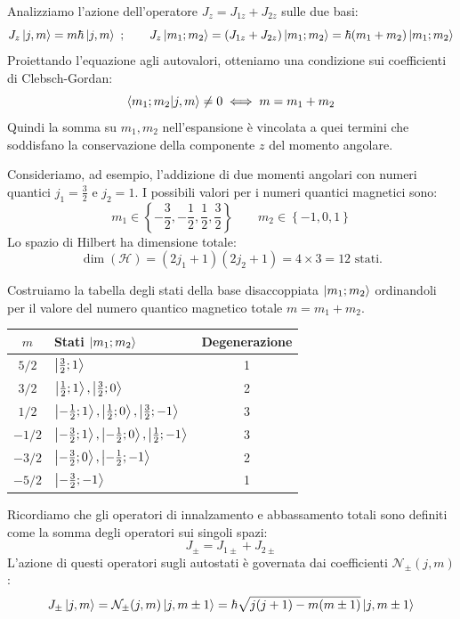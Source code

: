 Analizziamo l'azione dell'operatore $J_z = J_{1z} + J_{2z}$ sulle due basi:
\[
    J_z \ket{j, m} = m\hbar \ket{j, m} \ ;
    \qquad
    J_z \ket{m_1; m_2} = (J_{1z} + J_{2z})\ket{m_1; m_2} = \hbar(m_1 + m_2)\ket{m_1; m_2}
\]
Proiettando l'equazione agli autovalori, otteniamo una condizione sui coefficienti di Clebsch-Gordan:
\begin{equation}
    \braket{m_1; m_2}{j, m} \neq 0 \iff m = m_1 + m_2
\end{equation}
Quindi la somma su $m_1, m_2$ nell'espansione è vincolata a quei termini che soddisfano la conservazione della componente $z$ del momento angolare.

Consideriamo, ad esempio, l'addizione di due momenti angolari con numeri quantici $j_1 = \frac{3}{2}$ e $j_2 = 1$.
I possibili valori per i numeri quantici magnetici sono:
\[
    m_1 \in \left\{ -\frac{3}{2}, -\frac{1}{2}, \frac{1}{2}, \frac{3}{2} \right\} \qquad 
    m_2 \in \left\{ -1, 0, 1 \right\}
\]
Lo spazio di Hilbert ha dimensione totale:
\[
    \dim(\mathcal{H}) = (2j_1+1)(2j_2+1) = 4 \times 3 = 12 \text{ stati}.
\]

Costruiamo la tabella degli stati della base disaccoppiata $\ket{m_1; m_2}$ ordinandoli per il valore del numero quantico magnetico totale $m = m_1 + m_2$.

\begin{center}
\begin{tabular}{c | l | c}
    $m$ & Stati $\ket{m_1; m_2}$ & Degenerazione \\
    \hline
    $5/2$ & $\ket{\frac{3}{2}; 1}$ & 1 \\
    $3/2$ & $\ket{\frac{1}{2}; 1}, \ket{\frac{3}{2}; 0}$ & 2 \\
    $1/2$ & $\ket{-\frac{1}{2}; 1}, \ket{\frac{1}{2}; 0}, \ket{\frac{3}{2}; -1}$ & 3 \\
    $-1/2$ & $\ket{-\frac{3}{2}; 1}, \ket{-\frac{1}{2}; 0}, \ket{\frac{1}{2}; -1}$ & 3 \\
    $-3/2$ & $\ket{-\frac{3}{2}; 0}, \ket{-\frac{1}{2}; -1}$ & 2 \\
    $-5/2$ & $\ket{-\frac{3}{2}; -1}$ & 1 \\
\end{tabular}
\end{center}

Ricordiamo che gli operatori di innalzamento e abbassamento totali sono definiti come la somma degli operatori sui singoli spazi:
\begin{equation}
    J_{\pm} = J_{1\pm} + J_{2\pm}
\end{equation}
L'azione di questi operatori sugli autostati è governata dai coefficienti \( \mathcal{N}_{\pm}(j,m) \):
\begin{equation}
    J_{\pm}\ket{j,m} = \mathcal{N}_{\pm}(j,m)\ket{j, m\pm 1} = \hbar\sqrt{j(j+1) - m(m\pm 1)}\ket{j, m\pm 1}
\end{equation}

